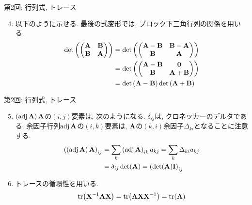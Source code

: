 \documentclass[dvipdfmx,notheorems,t]{beamer}
\begin{document}
\begin{frame}{第2回: 行列式, トレース}
\begin{enumerate}
  \setcounter{enumi}{3}
  \item 以下のように示せる.
  最後の式変形では, ブロック下三角行列の関係を用いる.
  \begin{align*}
    \det\left( \mqty(\vb{A} & \vb{B} \\ \vb{B} & \vb{A}) \right)
      &= \det\left( \mqty(\vb{A} - \vb{B} & \vb{B} - \vb{A} \\ \vb{B} & \vb{A}) \right) \\
      &= \det\left( \mqty(\vb{A} - \vb{B} & \vb{0} \\ \vb{B} & \vb{A} + \vb{B}) \right) \\
      &= \det\left( \vb{A} - \vb{B} \right) \det\left( \vb{A} + \vb{B} \right)
  \end{align*}
\end{enumerate}
\end{frame}

\begin{frame}{第2回: 行列式, トレース}
\begin{enumerate}
  \setcounter{enumi}{4}
  \item $\left( \operatorname{adj} \vb{A} \right) \vb{A}$の$(i, j)$要素は, 次のようになる.
  $\delta_{ij}$は, クロネッカーのデルタである.
  余因子行列$\operatorname{adj} \vb{A}$の$(i, k)$要素は, $\vb{A}$の$(k, i)$余因子$\Delta_{ki}$となることに注意する.
  \begin{align*}
    \left( \left( \operatorname{adj} \vb{A} \right) \vb{A} \right)_{ij}
      &= \sum_k \left( \operatorname{adj} \vb{A} \right)_{ik} a_{kj}
      = \sum_k \Delta_{ki} a_{kj} \\
      &= \delta_{ij} \det(\vb{A}) = \left( \det(\vb{A}) \vb{I} \right)_{ij}
  \end{align*}
  \item トレースの循環性を用いる.
  \begin{align*}
    \tr(\vb{X}^{-1} \vb{A} \vb{X}) = \tr(\vb{A} \vb{X} \vb{X}^{-1}) = \tr(\vb{A})
  \end{align*}
\end{enumerate}
\end{frame}
\end{document}
